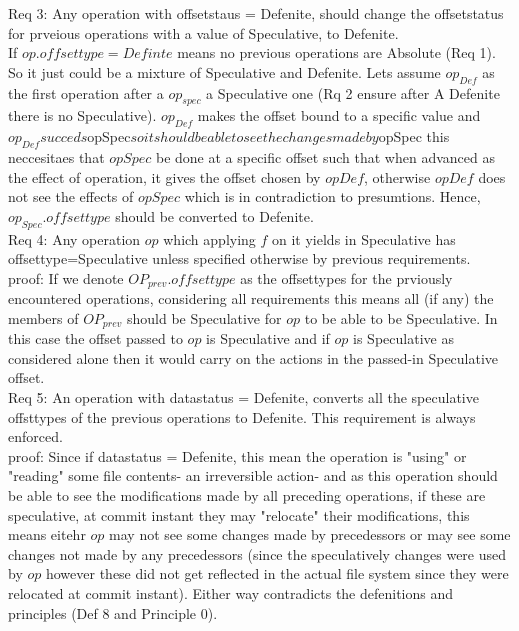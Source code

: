 \documentclass[a4paper, 11pt]{article}
\begin{document}
Req 3: Any operation with offsetstaus = Defenite, should change the offsetstatus for prveious operations with a value of Speculative, to Defenite.\\

If $op.offsettype = Definte$ means no previous operations are Absolute (Req 1). So it just could be a mixture of Speculative and Defenite. Lets assume $op_{Def}$ as the first operation after a $op_{spec}$ a Speculative one (Rq 2 ensure after A Defenite there is no Speculative).  $op_{Def}$ makes the offset bound to a specific value and $op_{Def} succeds $op{Spec}$ so it should be able to see the changes made by $op{Spec} this neccesitaes that $op{Spec}$ be done at a specific offset such that when advanced as the effect of operation, it gives the offset chosen by $op{Def}$, otherwise $op{Def}$ does not see the effects of $op{Spec}$ which is in contradiction to presumtions. Hence, $op_{Spec}.offsettype$ should be converted to Defenite.\\

Req 4: Any operation $op$ which applying $f$ on it yields in Speculative has offsettype=Speculative unless specified otherwise by previous requirements.\\

proof: If we denote $OP_{prev}.offsettype$ as the offsettypes for the prviously encountered operations, considering all requirements this means all (if any) the members of $OP_{prev}$ should be Speculative for $op$ to be able to be Speculative. In this case the offset passed to $op$ is Speculative and if $op$ is Speculative as considered alone then it would carry on the actions in the passed-in Speculative offset.\\ 

Req 5: An operation with datastatus = Defenite, converts all the speculative offsttypes of the previous operations to Defenite. This requirement is always enforced.\\

proof: Since if datastatus = Defenite, this mean the operation is "using" or "reading" some file contents- an irreversible action- and as this operation should be able to see the modifications made by all preceding operations, if these are speculative, at commit instant they may "relocate" their modifications, this means eitehr $op$ may not see some changes made by precedessors or may see some changes not made by any precedessors (since the speculatively changes were used by $op$ however these did not get reflected in the actual file system since they were relocated at commit instant). Either way contradicts the defenitions and principles (Def 8 and Principle 0).\\
\end{document}

